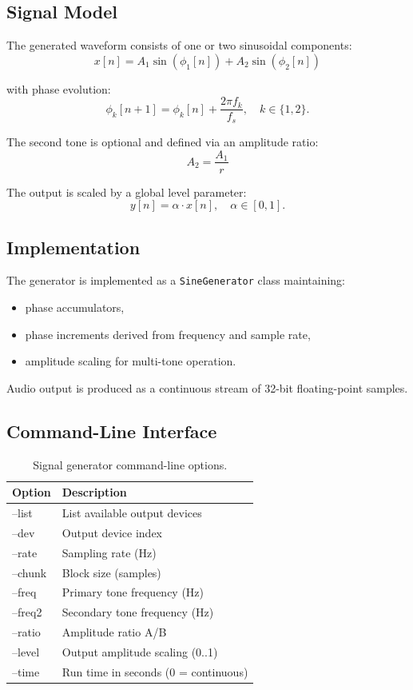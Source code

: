 \documentclass[conference]{IEEEtran}
\begin{document}
\subsection{Signal Model}
The generated waveform consists of one or two sinusoidal components:
\begin{equation}
x[n] = A_1 \sin(\phi_1[n]) + A_2 \sin(\phi_2[n])
\end{equation}

with phase evolution:
\begin{equation}
\phi_k[n+1] = \phi_k[n] + \frac{2\pi f_k}{f_s}, \quad k \in \{1,2\}.
\end{equation}

The second tone is optional and defined via an amplitude ratio:
\begin{equation}
A_2 = \frac{A_1}{r}
\end{equation}

The output is scaled by a global level parameter:
\begin{equation}
y[n] = \alpha \cdot x[n], \quad \alpha \in [0,1].
\end{equation}

\subsection{Implementation}
The generator is implemented as a \texttt{SineGenerator} class maintaining:
\begin{itemize}[leftmargin=*,nosep]
    \item phase accumulators,
    \item phase increments derived from frequency and sample rate,
    \item amplitude scaling for multi-tone operation.
\end{itemize}

Audio output is produced as a continuous stream of 32-bit floating-point samples.

\subsection{Command-Line Interface}
\begin{table}[t]
\centering
\caption{Signal generator command-line options.}
\label{tab:gen_cli}
\begin{tabular}{>{\ttfamily}p{2.6cm} p{4.8cm}}
\toprule
Option & Description \\
\midrule
--list & List available output devices \\
--dev & Output device index \\
--rate & Sampling rate (Hz) \\
--chunk & Block size (samples) \\
--freq & Primary tone frequency (Hz) \\
--freq2 & Secondary tone frequency (Hz) \\
--ratio & Amplitude ratio A/B \\
--level & Output amplitude scaling (0..1) \\
--time & Run time in seconds (0 = continuous) \\
\bottomrule
\end{tabular}
\end{table}
\end{document}
